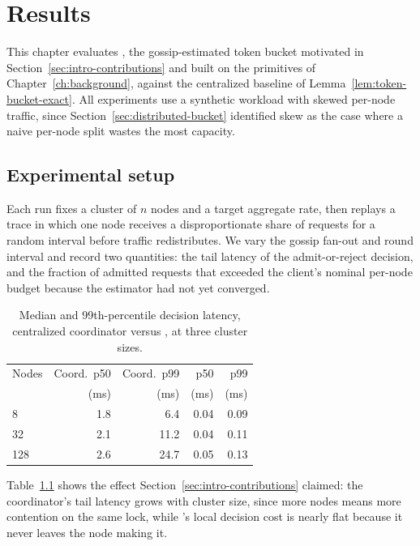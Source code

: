 \chapter{Results}
\label{ch:results}

This chapter evaluates \sysname{}, the gossip-estimated token bucket motivated in
Section~\ref{sec:intro-contributions} and built on the primitives of
Chapter~\ref{ch:background}, against the centralized baseline of
Lemma~\ref{lem:token-bucket-exact}. All experiments use a synthetic workload with skewed
per-node traffic, since Section~\ref{sec:distributed-bucket} identified skew as the case
where a naive per-node split wastes the most capacity.

\section{Experimental setup}

Each run fixes a cluster of $n$ nodes and a target aggregate rate, then replays a trace in
which one node receives a disproportionate share of requests for a random interval before
traffic redistributes. We vary the gossip fan-out and round interval and record two
quantities: the tail latency of the admit-or-reject decision, and the fraction of admitted
requests that exceeded the client's nominal per-node budget because the estimator had not
yet converged.

\begin{table}[ht]
  \centering
  \caption{Median and 99th-percentile decision latency, centralized coordinator versus
    \sysname{}, at three cluster sizes.}
  \label{tab:throughput}
  \begin{tabular}{lrrrr}
    \toprule
    Nodes & Coord.\ p50 & Coord.\ p99 & \sysname{} p50 & \sysname{} p99 \\
     & (ms) & (ms) & (ms) & (ms) \\
    \midrule
    8   & 1.8 & 6.4  & 0.04 & 0.09 \\
    32  & 2.1 & 11.2 & 0.04 & 0.11 \\
    128 & 2.6 & 24.7 & 0.05 & 0.13 \\
    \bottomrule
  \end{tabular}
\end{table}

Table~\ref{tab:throughput} shows the effect Section~\ref{sec:intro-contributions} claimed:
the coordinator's tail latency grows with cluster size, since more nodes means more
contention on the same lock, while \sysname{}'s local decision cost is nearly flat because
it never leaves the node making it.

